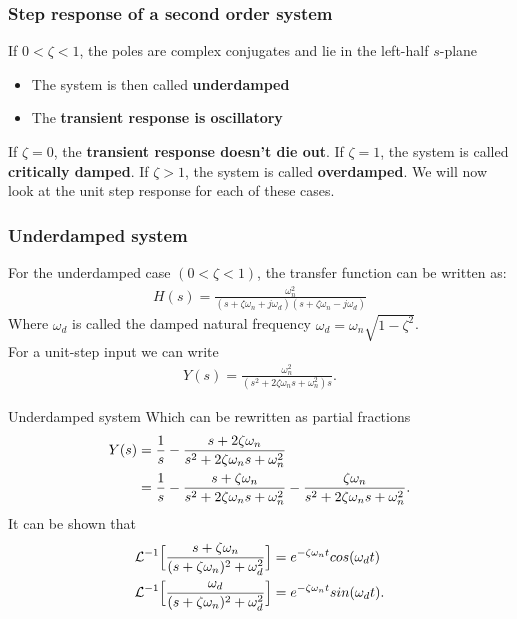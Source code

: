 \begin{frame}
\frametitle{Step response of a second order system}
If $0<\zeta<1$, the poles are complex conjugates and lie in the left-half $s$-plane
\begin{itemize}
\item The system is then called \textbf{underdamped}
\item The \textbf{transient response is oscillatory}
\end{itemize}
\vspace{0.15cm}
If $\zeta=0$, the \textbf{transient response doesn't die out}. If $\zeta=1$, the system is called \textbf{critically damped}. If $\zeta>1$, the system is called \textbf{overdamped}. We will now look at the unit step response for each of these cases.
\end{frame}

\begin{frame}
\frametitle{Underdamped system}
For the underdamped case $(0< \zeta< 1)$, the transfer function can be written as:
\vspace{-0.25cm}
\begin{align*}
H(s)=\frac{\omega_n ^2}{(s+\zeta\omega_n+j\omega_d)(s+\zeta\omega_n-j\omega_d)}
\end{align*}
Where $\omega_d$ is called the damped natural frequency 
$\omega_d = \omega_n\sqrt{1-\zeta^2}$.\\
\vspace{1em}
For a unit-step input we can write
\vspace{-0.25cm} 
\begin{align*}
Y(s)=\frac{\omega_n ^2}{(s^2+2\zeta\omega_n s+\omega_n ^2)s}.
\end{align*}
\end{frame}

\begin{frame}{Underdamped system}
Which can be rewritten as partial fractions\\
\vspace{-0.5cm}
\begin{align*}
Y(s)&=\frac{1}{s} -\frac{s+2\zeta\omega_n}{s^2+2\zeta\omega_n s+ \omega_n ^2} \\ \vspace{2cm}
&= \frac{1}{s} -\frac{s+\zeta\omega_n}{s^2+2\zeta\omega_n s+ \omega_n ^2} -\frac{\zeta\omega_n}{s^2+2\zeta\omega_n s+ \omega_n ^2}.
\end{align*}
It can be shown that\\
\vspace{-1em} 
\begin{align*}
\mathcal{L}^{-1}\Big[\frac{s+\zeta\omega_n}{(s+\zeta\omega_n)^2+\omega_d ^2}\Big]&= e^{-\zeta\omega_n t}cos(\omega_d t)\\  \vspace{2cm}
\mathcal{L}^{-1}\Big[\frac{\omega_d}{(s+\zeta\omega_n)^2+\omega_d ^2}\Big]&= e^{-\zeta\omega_n t}sin(\omega_d t).
\end{align*}
\end{frame}


